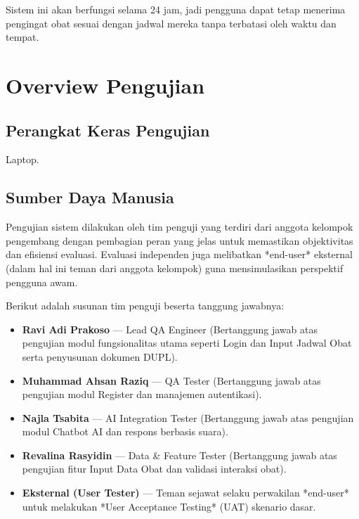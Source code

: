 \documentclass[12pt, a4paper]{article}
\begin{document}
Sistem ini akan berfungsi selama 24 jam, jadi pengguna dapat tetap menerima
pengingat obat sesuai dengan jadwal mereka tanpa terbatasi oleh waktu dan tempat.

\section{Overview Pengujian}

\subsection{Perangkat Keras Pengujian}

Laptop.

\subsection{Sumber Daya Manusia}

Pengujian sistem dilakukan oleh tim penguji yang terdiri dari anggota kelompok pengembang dengan pembagian peran yang jelas untuk memastikan objektivitas dan efisiensi evaluasi. Evaluasi independen juga melibatkan *end-user* eksternal (dalam hal ini teman dari anggota kelompok) guna mensimulasikan perspektif pengguna awam. 

Berikut adalah susunan tim penguji beserta tanggung jawabnya:
\begin{itemize}[leftmargin=2em]
  \item \textbf{Ravi Adi Prakoso} --- Lead QA Engineer (Bertanggung jawab atas pengujian modul fungsionalitas utama seperti Login dan Input Jadwal Obat serta penyusunan dokumen DUPL).
  \item \textbf{Muhammad Ahsan Raziq} --- QA Tester (Bertanggung jawab atas pengujian modul Register dan manajemen autentikasi).
  \item \textbf{Najla Tsabita} --- AI Integration Tester (Bertanggung jawab atas pengujian modul Chatbot AI dan respons berbasis suara).
  \item \textbf{Revalina Rasyidin} --- Data \& Feature Tester (Bertanggung jawab atas pengujian fitur Input Data Obat dan validasi interaksi obat).
  \item \textbf{Eksternal (User Tester)} --- Teman sejawat selaku perwakilan *end-user* untuk melakukan *User Acceptance Testing* (UAT) skenario dasar.
\end{itemize}
\end{document}
